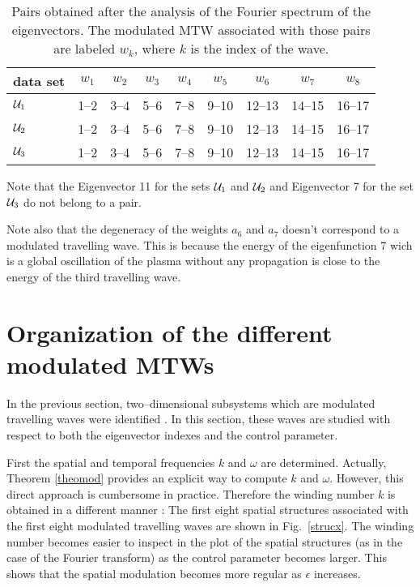 \begin{table}[htb]
 \begin{center}
  \caption{Pairs obtained after the analysis of the Fourier spectrum
 of the eigenvectors. The modulated MTW associated with those pairs 
are labeled $w_k$, where $k$ is the index of the wave.}
  \label{tabpairtf}
  \begin{tabular}{l|c|c|c|c|c|c|c|c}
  data set   &$w_1$&$w_2$&$w_3$&$w_4$&$w_5$&$w_6$&$w_7$&$w_8$\\
\hline
${\cal U}_1$ &1--2&3--4&5--6&7--8&9--10&12--13&14--15&16--17\\
${\cal U}_2$ &1--2&3--4&5--6&7--8&9--10&12--13&14--15&16--17\\
${\cal U}_3$ &1--2&3--4&5--6&7--8&9--10&12--13&14--15&16--17\\
\hline
  \end{tabular}
 \end{center}
\end{table}
%

Note that the Eigenvector 11 for the sets ${\cal U}_1$ and
${\cal U}_2$  and Eigenvector 7 for the set ${\cal U}_3$
do not belong to a pair. 

Note also that the degeneracy of the weights $a_6$ and $a_7$
doesn't correspond to a modulated travelling wave. This is because
the energy of the eigenfunction 7 wich is a global oscillation
of the plasma without any propagation is close to the energy
of the third travelling wave.


\section{\label{secorg}Organization of the different modulated MTWs}
In the previous section, two--dimensional subsystems
which are modulated travelling waves were identified . 
In this section, these waves
are studied with respect to both the eigenvector indexes and the
control parameter. 

\medskip

First the spatial and temporal frequencies $k$ and $\omega$ are
determined. Actually, Theorem \ref{theomod} provides an explicit way
to compute $k$ and $\omega$. However, this direct approach is
cumbersome in practice. Therefore the winding number $k$ is obtained
in a different manner : The first eight spatial
structures associated with the first eight modulated travelling waves
are shown in Fig.~\ref{strucx}.
The winding number becomes easier to inspect in the plot of the spatial
structures (as in the case of the Fourier transform) as the control 
parameter becomes larger. This shows that the spatial modulation 
becomes more regular as $\epsilon$ increases.

